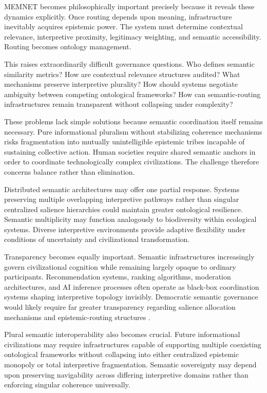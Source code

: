 \documentclass[11pt,a4paper]{article}
\begin{document}
MEMNET becomes philosophically important precisely because it reveals these dynamics explicitly. Once routing depends upon meaning, infrastructure inevitably acquires epistemic power. The system must determine contextual relevance, interpretive proximity, legitimacy weighting, and semantic accessibility. Routing becomes ontology management.

This raises extraordinarily difficult governance questions. Who defines semantic similarity metrics? How are contextual relevance structures audited? What mechanisms preserve interpretive plurality? How should systems negotiate ambiguity between competing ontological frameworks? How can semantic-routing infrastructures remain transparent without collapsing under complexity?

These problems lack simple solutions because semantic coordination itself remains necessary. Pure informational pluralism without stabilizing coherence mechanisms risks fragmentation into mutually unintelligible epistemic tribes incapable of sustaining collective action. Human societies require shared semantic anchors in order to coordinate technologically complex civilizations. The challenge therefore concerns balance rather than elimination.

Distributed semantic architectures may offer one partial response. Systems preserving multiple overlapping interpretive pathways rather than singular centralized salience hierarchies could maintain greater ontological resilience. Semantic multiplicity may function analogously to biodiversity within ecological systems. Diverse interpretive environments provide adaptive flexibility under conditions of uncertainty and civilizational transformation.

Transparency becomes equally important. Semantic infrastructures increasingly govern civilizational cognition while remaining largely opaque to ordinary participants. Recommendation systems, ranking algorithms, moderation architectures, and AI inference processes often operate as black-box coordination systems shaping interpretive topology invisibly. Democratic semantic governance would likely require far greater transparency regarding salience allocation mechanisms and epistemic-routing structures \cite{gillespie2018}.

Plural semantic interoperability also becomes crucial. Future informational civilizations may require infrastructures capable of supporting multiple coexisting ontological frameworks without collapsing into either centralized epistemic monopoly or total interpretive fragmentation. Semantic sovereignty may depend upon preserving navigability across differing interpretive domains rather than enforcing singular coherence universally.
\end{document}
